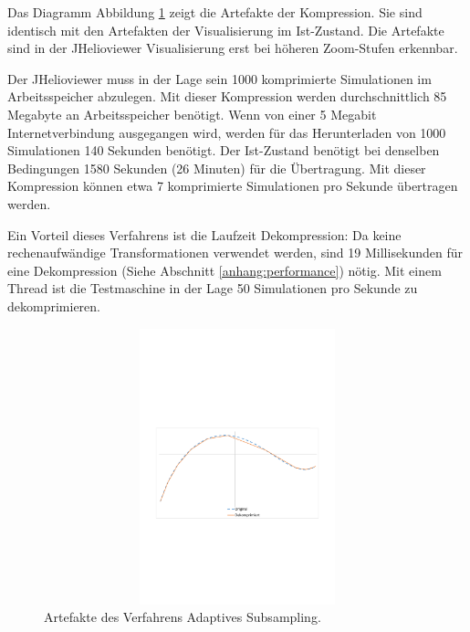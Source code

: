 Das Diagramm Abbildung \ref{resultate:loesung0:artefakte} zeigt die Artefakte der Kompression. Sie sind identisch mit den Artefakten der Visualisierung im Ist-Zustand. Die Artefakte sind in der JHelioviewer Visualisierung erst bei höheren Zoom-Stufen erkennbar.

Der JHelioviewer muss in der Lage sein 1000 komprimierte Simulationen im Arbeitsspeicher abzulegen. Mit dieser Kompression werden durchschnittlich 85 Megabyte an Arbeitsspeicher benötigt. Wenn von einer 5 Megabit Internetverbindung ausgegangen wird, werden für das Herunterladen von 1000 Simulationen 140 Sekunden benötigt. Der Ist-Zustand benötigt bei denselben Bedingungen 1580 Sekunden (26 Minuten) für die Übertragung. Mit dieser Kompression können etwa 7 komprimierte Simulationen pro Sekunde übertragen werden. 

Ein Vorteil dieses Verfahrens ist die Laufzeit Dekompression: Da keine rechenaufwändige Transformationen verwendet werden, sind 19 Millisekunden für eine Dekompression (Siehe Abschnitt \ref{anhang:performance}) nötig. Mit einem Thread ist die Testmaschine in der Lage 50 Simulationen pro Sekunde zu dekomprimieren.

\begin{figure}[!htbp]
	\center
	\includegraphics[trim = 1.8cm 9.8cm 1.8cm 11.2cm, clip=true, width=1\textwidth,height=8cm,keepaspectratio]{./pictures/resultate/loesung0/loesung0_artefakte.pdf}
	\caption{Artefakte des Verfahrens Adaptives Subsampling.}
	\label{resultate:loesung0:artefakte}
\end{figure}